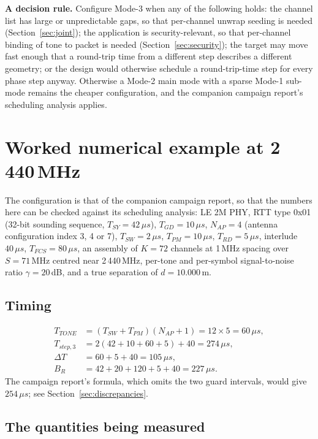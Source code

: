 \documentclass[11pt,a4paper]{article}
\newcommand{\us}{\,\ensuremath{\upmu}s}
\newcommand{\Tsy}{T_{SY}}
\newcommand{\Tgd}{T_{GD}}
\newcommand{\Ttone}{T_{TONE}}
\newcommand{\Tsw}{T_{SW}}
\newcommand{\Tpm}{T_{PM}}
\newcommand{\Trd}{T_{RD}}
\newcommand{\Nap}{N_{AP}}
\providecommand{\upmu}{\mu}
\begin{document}
\begin{callout}
\textbf{A decision rule.} Configure Mode-3 when any of the following holds: the channel list has
large or unpredictable gaps, so that per-channel unwrap seeding is needed
(Section~\ref{sec:joint}); the application is security-relevant, so that per-channel binding of tone
to packet is needed (Section~\ref{sec:security}); the target may move fast enough that a
round-trip time from a different step describes a different geometry; or the design would otherwise
schedule a round-trip-time step for every phase step anyway. Otherwise a Mode-2 main mode with a
sparse Mode-1 sub-mode remains the cheaper configuration, and the companion campaign report's
scheduling analysis applies.
\end{callout}

\section{Worked numerical example at 2\,440\,MHz}
\label{sec:example}

The configuration is that of the companion campaign report, so that the numbers here can be checked
against its scheduling analysis: LE 2M PHY, RTT type 0x01 (32-bit sounding sequence, $\Tsy=42\us$),
$\Tgd=10\us$, $\Nap=4$ (antenna configuration index 3, 4 or 7), $\Tsw=2\us$, $\Tpm=10\us$,
$\Trd=5\us$, interlude $40\us$, $T_{FCS}=80\us$, an assembly of $K=72$ channels at 1\,MHz spacing
over $S=71$\,MHz centred near 2\,440\,MHz, per-tone and per-symbol signal-to-noise ratio
$\gamma=20$\,dB, and a true separation of $d=10.000$\,m.

\subsection{Timing}

\begin{align}
\Ttone &= (\Tsw+\Tpm)(\Nap+1) = 12 \times 5 = 60\us, \\
T_{step,3} &= 2(42+10+60+5) + 40 = 274\us, \\
\Delta T &= 60 + 5 + 40 = 105\us, \\
B_R &= 42 + 20 + 120 + 5 + 40 = 227\us .
\end{align}
The campaign report's formula, which omits the two guard intervals, would give $254\us$; see
Section~\ref{sec:discrepancies}.

\subsection{The quantities being measured}
\end{document}
